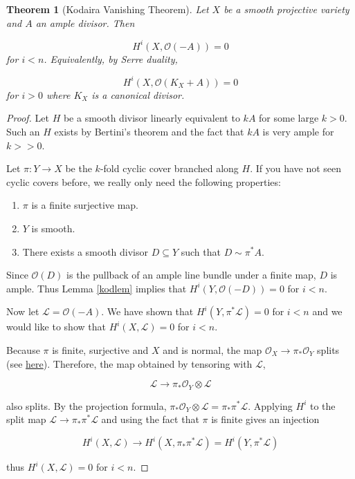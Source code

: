 \documentclass[a4paper]{article}
\newcommand{\LL}{\mathcal{L}}
\newcommand{\OO}{\mathcal{O}}
\newtheorem{theorem}{Theorem}
\numberwithin{theorem}{section}
\numberwithin{equation}{section}
\begin{document}
\begin{theorem}[Kodaira Vanishing Theorem]
    Let $X$ be a smooth projective variety and $A$ an ample divisor. Then

    $$ H^i(X,\OO(-A)) = 0 $$
    for $i < n$. Equivalently, by Serre duality, 

    $$ H^i(X,\OO(K_X + A)) = 0 $$
    for $i > 0$ where $K_X$ is a canonical divisor.
\end{theorem}
\begin{proof}
    Let $H$ be a smooth divisor linearly equivalent to $kA$ for some large $k > 0$. Such an $H$ exists by Bertini's theorem and the fact that $kA$ is very ample for $k >> 0$. 

    Let $\pi: Y \rightarrow X$ be the $k$-fold cyclic cover branched along $H$. If you have not seen cyclic covers before, we really only need the following properties:
    
\begin{enumerate}
    \item $\pi$ is a finite surjective map.
    \item $Y$ is smooth.
    \item There exists a smooth divisor $D \subseteq Y$ such that $D \sim \pi^* A$.
\end{enumerate}

    Since $\OO(D)$ is the pullback of an ample line bundle under a finite map, $D$ is ample. Thus Lemma \ref{kodlem} implies that $H^i(Y,\OO(-D)) = 0$ for $i < n$.

    Now let $\LL = \OO(-A)$. We have shown that $H^i(Y,\pi^*\LL) = 0$ for $i < n$ and we would like to show that $H^i(X,\LL) = 0$ for $i < n$. 

    Because $\pi$ is finite, surjective and $X$ and is normal, the map $\OO_X \rightarrow \pi_* \OO_Y$ splits (see \href{https://math.stackexchange.com/q/3402161}{here}). Therefore, the map obtained by tensoring with $\LL$,
    
    $$\LL \rightarrow \pi_* \OO_Y \otimes \LL $$
    
    also splits. By the projection formula, $\pi_* \OO_Y \otimes \LL = \pi_* \pi^* \LL$. Applying $H^i$ to the split map $\LL \rightarrow \pi_* \pi^* \LL$ and using the fact that $\pi$ is finite gives an injection

    $$ H^i(X,\LL) \rightarrow H^i(X,\pi_*\pi^* \LL) = H^i(Y,\pi^* \LL) $$

    thus $H^i(X,\LL) = 0$ for $i < n$.
    
\end{proof}
\end{document}
